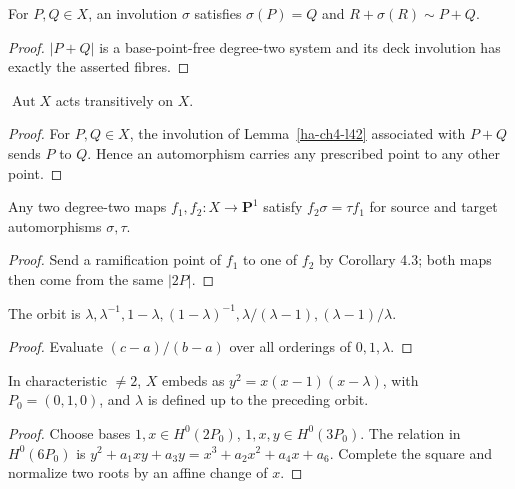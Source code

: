 \begin{lemma}[Involution]\label{ha-ch4-l42}
For \(P,Q\in X\), an involution \(\sigma\) satisfies
\(\sigma(P)=Q\) and \(R+\sigma(R)\sim P+Q\).
\end{lemma}
\begin{proof}
\(|P+Q|\) is a base-point-free degree-two system and its deck involution has
exactly the asserted fibres.
\end{proof}
\begin{corollary}[Transitivity]\label{ha-ch4-c43}
\(\operatorname{Aut}X\) acts transitively on \(X\).
\end{corollary}
\begin{proof}
For $P,Q\in X$, the involution of Lemma~\ref{ha-ch4-l42} associated with $P+Q$ sends $P$ to
$Q$.  Hence an automorphism carries any prescribed point to any other point.
\end{proof}
\begin{lemma}\label{ha-ch4-l44}
Any two degree-two maps \(f_1,f_2:X\to\mathbf P^1\) satisfy
\(f_2\sigma=\tau f_1\) for source and target automorphisms \(\sigma,\tau\).
\end{lemma}
\begin{proof}
Send a ramification point of \(f_1\) to one of \(f_2\) by Corollary 4.3;
both maps then come from the same \(|2P|\).
\end{proof}
\begin{lemma}\label{ha-ch4-l45}
The orbit is \(\lambda,\lambda^{-1},1-\lambda,(1-\lambda)^{-1},
\lambda/(\lambda-1),(\lambda-1)/\lambda\).
\end{lemma}
\begin{proof}
Evaluate \((c-a)/(b-a)\) over all orderings of \(0,1,\lambda\).
\end{proof}

\begin{proposition}\label{ha-ch4-p46}
In characteristic \(\ne2\), \(X\) embeds as
\(y^2=x(x-1)(x-\lambda)\), with \(P_0=(0,1,0)\), and \(\lambda\) is defined
up to the preceding orbit.
\end{proposition}
\begin{proof}
Choose bases \(1,x\in H^0(2P_0)\), \(1,x,y\in H^0(3P_0)\).  The relation in
\(H^0(6P_0)\) is \(y^2+a_1xy+a_3y=x^3+a_2x^2+a_4x+a_6\). Complete the
square and normalize two roots by an affine change of \(x\).
\end{proof}

